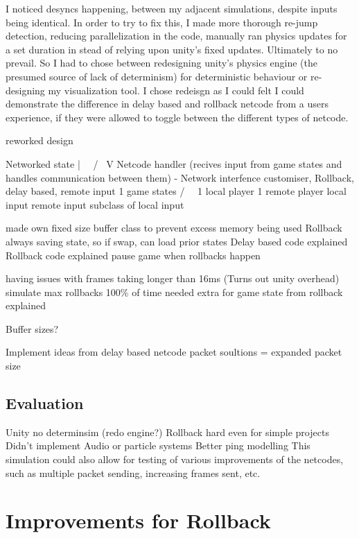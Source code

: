 \documentclass{entcs}
\begin{document}
I noticed desyncs happening, between my adjacent simulations, despite inputs being identical. In order to try to fix this, I made more thorough re-jump detection, reducing parallelization in the code, manually ran physics updates for a set duration in stead of relying upon unity's fixed updates. Ultimately to no prevail. So I had to chose between redesigning unity's physics engine (the presumed source of lack of determinism) for deterministic behaviour or re-designing my visualization tool. I chose redeisgn as I could felt I could demonstrate the difference in delay based and rollback netcode from a users experience, if they were allowed to toggle between the different types of netcode.

reworked design

Networked state
 |                  \
\ /                  \
 V                    Netcode handler (recives input from game states and handles communication between them) - Network interfence customiser, Rollback, delay based, remote input
1 game states              
/             \                        \
1 local player   1 remote player        local input
 remote input subclass of local input

made own fixed size buffer class to prevent excess memory being used
Rollback always saving state, so if swap, can load prior states
Delay based code explained
Rollback code explained
pause game when rollbacks happen

having issues with frames taking longer than 16ms (Turns out unity overhead)
simulate max rollbacks 100\% of time
needed extra for game state from rollback explained

Buffer sizes?

Implement ideas from delay based netcode packet soultions = expanded packet size

\subsection{Evaluation}
Unity no determinsim (redo engine?)
Rollback hard even for simple projects
Didn't implement Audio or particle systems
Better ping modelling
This simulation could also allow for testing of various improvements of the netcodes, such as multiple packet sending, increasing frames sent, etc.

\section{Improvements for Rollback}
\end{document}
